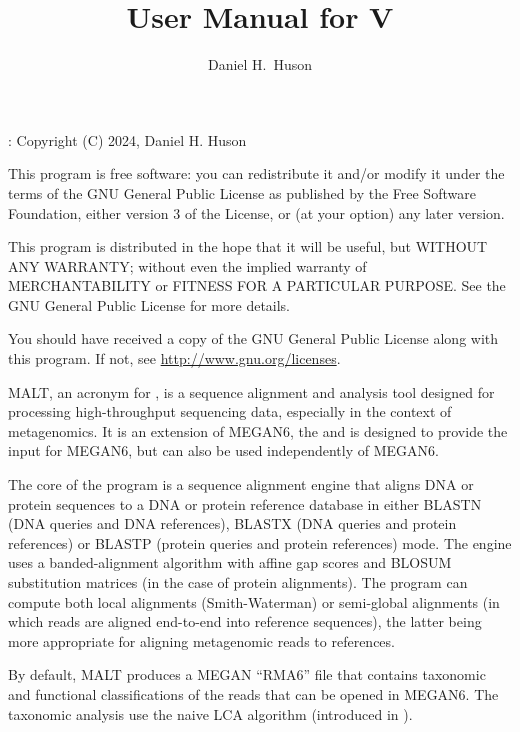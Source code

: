 \documentclass[11pt]{article}
\title{\bf User Manual for \MALT V\VERSION}
\author{Daniel H.~Huson}
\newcommand\MALT{{\sf MALT}\xspace}
\begin{document}

\maketitle


{\small
\setcounter{tocdepth}{1}
\tableofcontents
}
\newpage

:
Copyright (C) 2024, Daniel H. Huson

This program is free software: you can redistribute it and/or modify
it under the terms of the GNU General Public License as published by
the Free Software Foundation, either version 3 of the License, or
(at your option) any later version.

This program is distributed in the hope that it will be useful,
but WITHOUT ANY WARRANTY; without even the implied warranty of
MERCHANTABILITY or FITNESS FOR A PARTICULAR PURPOSE.  See the
GNU General Public License for more details.

You should have received a copy of the GNU General Public License
along with this program.  If not, see \url{http://www.gnu.org/licenses}.



\MALT, an acronym for  , is a sequence alignment and analysis tool designed for processing high-throughput sequencing data, especially in the context of metagenomics.
It is an extension of MEGAN6, the  and is designed to provide the input for MEGAN6,
but can also be used independently of MEGAN6.

The core of the program is a sequence alignment engine that aligns DNA or protein sequences
to a {DNA or} protein reference database in either {BLASTN (DNA queries and DNA references),}
BLASTX (DNA queries and protein references) or BLASTP (protein queries and protein references)
mode. The engine uses a banded-alignment algorithm with affine gap scores
and BLOSUM substitution matrices (in the case of protein alignments).
The program can compute both local alignments
(Smith-Waterman) or semi-global alignments (in which reads are aligned end-to-end into reference sequences), the latter being more appropriate for aligning metagenomic reads to references.

By default, \MALT produces a MEGAN ``RMA6'' file that contains taxonomic and functional classifications of the reads
that can be opened in MEGAN6.
The taxonomic analysis use the naive LCA algorithm (introduced in \cite{MEGAN2011}).
\end{document}
